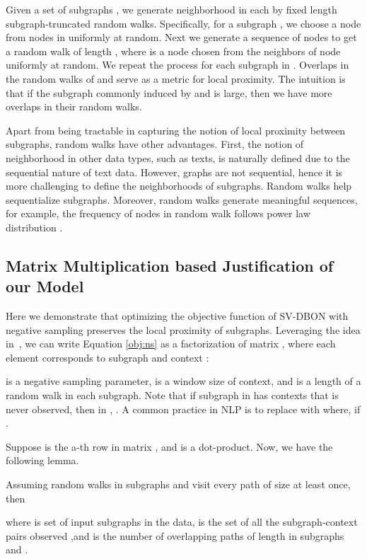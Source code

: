 \documentclass[sigconf]{acmart}
\begin{document}
Given a set of subgraphs , we generate neighborhood in each  by fixed length subgraph-truncated random walks. Specifically, for a subgraph , we choose a node  from nodes in  uniformly at random. Next we generate a sequence of nodes   to get a random walk of length , where  is a node chosen from the neighbors of node  uniformly at random. We repeat the process for each subgraph in . Overlaps in the random walks of  and  serve as a metric for local proximity. The intuition is that if the subgraph commonly induced by  and  is large, then we have more overlaps in their random walks.

Apart from being tractable in capturing the notion of local proximity between subgraphs, random walks have other advantages. First, the notion of neighborhood in other data types, such as texts, is naturally defined due to the sequential nature of text data. However, graphs are not sequential, hence  it is more challenging to define the neighborhoods of subgraphs. Random walks help sequentialize subgraphs. Moreover, 
random walks generate meaningful sequences, for example, the frequency of nodes in random walk follows power law distribution \cite{perozzi2014deepwalk}.


\subsection{Matrix Multiplication based Justification of our Model}
Here we demonstrate that optimizing the objective function of SV-DBON with negative sampling preserves the local proximity of subgraphs. Leveraging the idea in~\cite{levy2014neural}, we can write Equation \ref{obj:ns}
as a factorization of matrix ,  where  each element  corresponds to subgraph  and context :



 is a negative sampling parameter,  is a window size of context, and  is a length of a random walk in each subgraph.  
Note that if  subgraph  in  has contexts  that is never observed,  then in , . A common practice in NLP is to replace  with  where,  if  . 

Suppose  is the a-th row in matrix , and  is a dot-product. Now, we have the following lemma.

\begin{lemma}
\label{lemma:factorization}
Assuming random walks in subgraphs  and  visit every path of size  at least once, then

where  is set of input subgraphs in the data,  is the set of all the subgraph-context pairs observed ,and  is the number of overlapping paths of length  in subgraphs  and .
\end{lemma}
\end{document}
